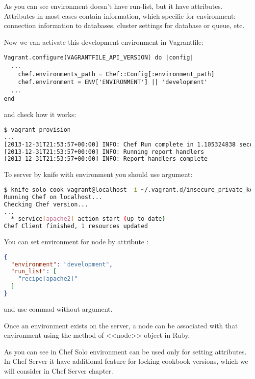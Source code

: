 As you can see environment doesn't have run-list, but it have attributes. Attributes in most cases contain information, which specific for environment: connection information to databases, cluster settings for database or queue, etc.

Now we can activate this development environment in Vagrantfile:

\begin{lstlisting}[label=lst:my-cloud-chef-environment2,title=my-cloud/Vagrantfile]
Vagrant.configure(VAGRANTFILE_API_VERSION) do |config|
  ...
    chef.environments_path = Chef::Config[:environment_path]
    chef.environment = ENV['ENVIRONMENT'] || 'development'
  ...
end
\end{lstlisting}

and check how it works:

\begin{lstlisting}[language=Bash,label=lst:my-cloud-chef-environment3]
$ vagrant provision
...
[2013-12-31T21:53:57+00:00] INFO: Chef Run complete in 1.105324838 seconds
[2013-12-31T21:53:57+00:00] INFO: Running report handlers
[2013-12-31T21:53:57+00:00] INFO: Report handlers complete
\end{lstlisting}

To  server by knife with environment you should use  argument:

\begin{lstlisting}[language=Bash,label=lst:my-cloud-chef-environment4]
$ knife solo cook vagrant@localhost -i ~/.vagrant.d/insecure_private_key -p 2222 -N web1.example.com -E development
Running Chef on localhost...
Checking Chef version...
...
  * service[apache2] action start (up to date)
Chef Client finished, 1 resources updated
\end{lstlisting}

You can set environment for node by attribute :

\begin{lstlisting}[language=JSON,label=lst:my-cloud-chef-environment5,title=my-cloud/nodes/web1.example.com.json]
{
  "environment": "development",
  "run_list": [
    "recipe[apache2]"
  ]
}
\end{lstlisting}

and use commad  without  argument.

Once an environment exists on the server, a node can be associated with that environment using the  method of <<node>> object in Ruby.

As you can see in Chef Solo environment can be used only for setting attributes. In Chef Server it have additional feature for locking cookbook versions, which we will consider in Chef Server chapter.
